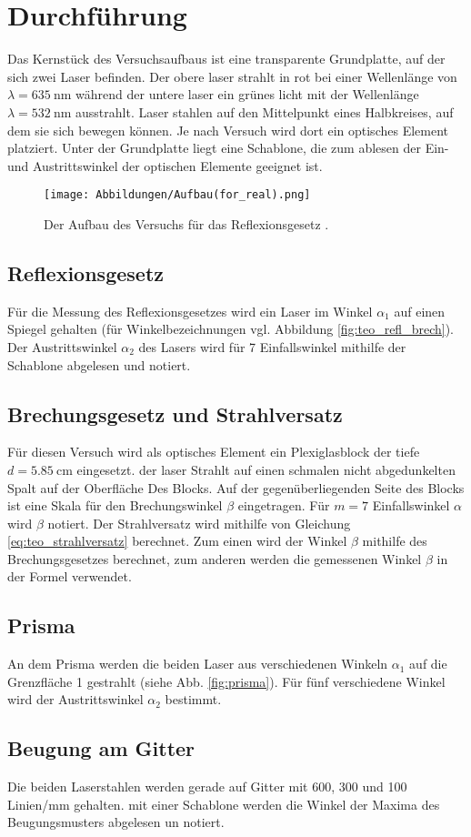 \section{Durchführung}
Das Kernstück des Versuchsaufbaus ist eine transparente Grundplatte, auf der sich zwei Laser befinden. 
Der obere laser strahlt in rot bei einer Wellenlänge von $\lambda = \qty{635}{\nano\meter}$ während der
untere laser ein grünes licht mit der Wellenlänge $\lambda = \qty{532}{\nano\meter}$ ausstrahlt.
Laser stahlen auf den Mittelpunkt eines Halbkreises, auf dem sie sich bewegen können.
Je nach Versuch wird dort ein optisches Element platziert.
Unter der Grundplatte liegt eine Schablone, die zum ablesen der Ein- und Austrittswinkel der optischen
Elemente geeignet ist.
\begin{figure}
    \centering
    \texttt{[image: Abbildungen/Aufbau(for\_real).png]}
    \caption{Der Aufbau des Versuchs für das Reflexionsgesetz \cite{man:v400}.}
\end{figure}

\subsection{Reflexionsgesetz}
Für die Messung des Reflexionsgesetzes wird ein Laser im Winkel
$\alpha_1$ auf einen Spiegel gehalten (für Winkelbezeichnungen vgl. Abbildung \ref{fig:teo_refl_brech}).
Der Austrittswinkel $\alpha_2$ des Lasers wird für 7 Einfallswinkel mithilfe der Schablone abgelesen und notiert.

\subsection{Brechungsgesetz und Strahlversatz}
Für diesen Versuch wird als optisches Element ein Plexiglasblock der tiefe $d = \qty{5.85}{\cm}$ eingesetzt.
der laser Strahlt auf einen schmalen nicht abgedunkelten Spalt auf der Oberfläche Des Blocks.
Auf der gegenüberliegenden Seite des Blocks ist eine Skala für den Brechungswinkel $\beta$ eingetragen.
Für $m= 7$ Einfallswinkel $\alpha$ wird $\beta$ notiert.
Der Strahlversatz wird mithilfe von Gleichung \eqref{eq:teo_strahlversatz} berechnet.
Zum einen wird der Winkel $\beta$ mithilfe des Brechungsgesetzes berechnet,
zum anderen werden die gemessenen Winkel $\beta$ in der Formel verwendet.

\subsection{Prisma}
An dem Prisma werden die beiden Laser aus verschiedenen Winkeln $\alpha_1$ auf die Grenzfläche 1 gestrahlt (siehe Abb. \ref{fig:prisma}).
Für fünf verschiedene Winkel wird der Austrittswinkel $\alpha_2$ bestimmt. 


\subsection{Beugung am Gitter}
Die beiden Laserstahlen werden gerade auf Gitter mit \num{600}, \num{300} und \num{100} Linien/\unit{\mm} gehalten.
mit einer Schablone werden die Winkel der Maxima des Beugungsmusters abgelesen un notiert.